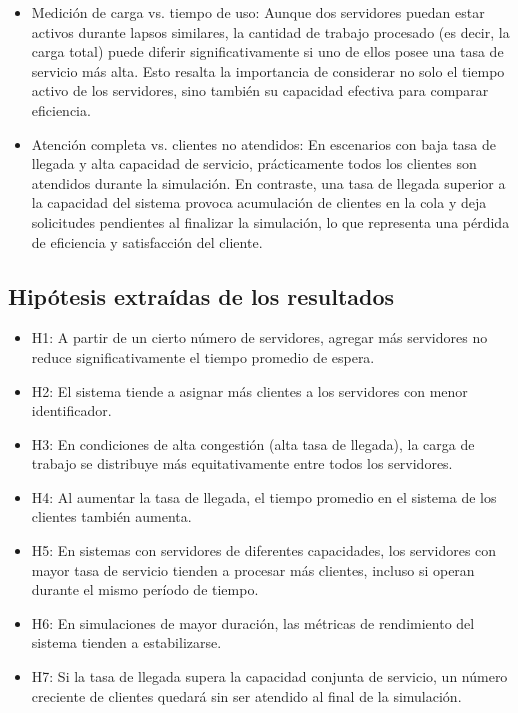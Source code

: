 \documentclass[12pt,a4paper]{article}
\begin{document}
\begin{itemize}
\item Medición de carga vs. tiempo de uso: Aunque dos servidores puedan estar activos durante lapsos similares, la cantidad de trabajo procesado (es decir, la carga total) puede diferir significativamente si uno de ellos posee una tasa de servicio más alta.  Esto resalta la importancia de considerar no solo el tiempo activo de los servidores, sino también su capacidad efectiva para  comparar eficiencia.
\item Atención completa vs. clientes no atendidos: En escenarios con baja tasa de llegada y alta capacidad de servicio, prácticamente  todos los clientes son atendidos durante la simulación. En contraste, una tasa de llegada superior a la capacidad del sistema  provoca acumulación de clientes en la cola y deja solicitudes pendientes al finalizar la simulación, lo que representa una  pérdida de eficiencia y satisfacción del cliente.
\end{itemize}

\subsection{Hipótesis extraídas de los resultados}
\begin{itemize}
\item H1: A partir de un cierto número de servidores, agregar más servidores no reduce significativamente el tiempo promedio de espera.
\item H2: El sistema tiende a asignar más clientes a los servidores con menor identificador.
\item H3: En condiciones de alta congestión (alta tasa de llegada), la carga de trabajo se distribuye más equitativamente entre todos 
los servidores.
\item H4: Al aumentar la tasa de llegada, el tiempo promedio en el sistema de los clientes también aumenta.
\item H5: En sistemas con servidores de diferentes capacidades, los servidores con mayor tasa de servicio tienden a procesar más 
clientes, incluso si operan durante el mismo período de tiempo.
\item H6: En simulaciones de mayor duración, las métricas de rendimiento del sistema tienden a estabilizarse.
\item H7: Si la tasa de llegada supera la capacidad conjunta de servicio, un número creciente de clientes quedará sin ser atendido 
al final de la simulación.
\end{itemize}
\end{document}
